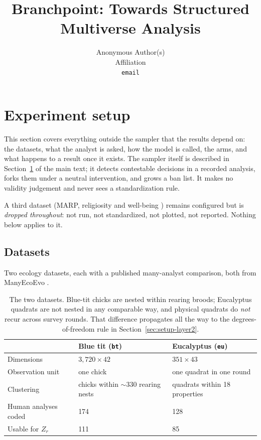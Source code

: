 \documentclass{article}
\title{Branchpoint: Towards Structured Multiverse Analysis}
\author{%
  Anonymous Author(s) \\
  Affiliation \\
  \texttt{email} \\
}
\begin{document}
\maketitle

\section{Experiment setup}
\label{sec:setup}

This section covers everything outside the sampler that the results depend on:
the datasets, what the analyst is asked, how the model is called, the arms, and
what happens to a result once it exists. The sampler itself is described in
Section~\ref{sec:setup} of the main text; it detects contestable decisions in a
recorded analysis, forks them under a neutral intervention, and grows a ban
list. It makes no validity judgement and never sees a standardization rule.

A third dataset (MARP, religiosity and well-being \cite{hoogeveen2023many})
remains configured but is \emph{dropped throughout}: not run, not standardized,
not plotted, not reported. Nothing below applies to it.

\subsection{Datasets}
\label{sec:setup-data}

Two ecology datasets, each with a published many-analyst comparison, both from
ManyEcoEvo \cite{gould2025same}.

\begin{table}[h]
\centering
\small
\begin{tabular}{lll}
\toprule
 & Blue tit (\texttt{bt}) & Eucalyptus (\texttt{eu}) \\
\midrule
Dimensions            & $3{,}720 \times 42$ & $351 \times 43$ \\
Observation unit      & one chick & one quadrat in one round \\
Clustering            & chicks within ${\sim}330$ rearing nests & quadrats within 18 properties \\
Human analyses coded  & 174 & 128 \\
Usable for $Z_r$      & 111 & 85 \\
\bottomrule
\end{tabular}
\caption{The two datasets. Blue-tit chicks are nested within rearing broods;
Eucalyptus quadrats are not nested in any comparable way, and physical quadrats
do \emph{not} recur across survey rounds. That difference propagates all the way
to the degrees-of-freedom rule in Section~\ref{sec:setup-layer2}.}
\label{tab:datasets}
\end{table}
\end{document}
